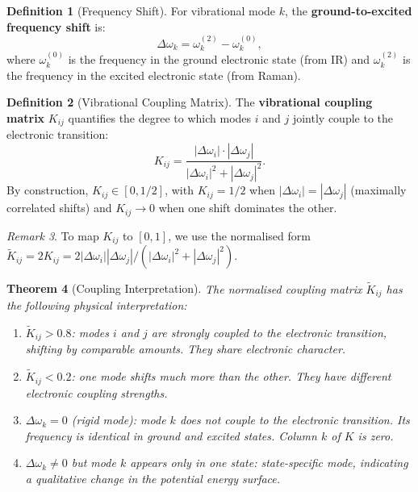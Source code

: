 \documentclass[11pt,a4paper]{article}
\newtheorem{theorem}{Theorem}[section]
\theoremstyle{definition}
\newtheorem{definition}[theorem]{Definition}
\theoremstyle{remark}
\newtheorem{remark}[theorem]{Remark}
\begin{document}
\begin{definition}[Frequency Shift]
\label{def:freq_shift}
For vibrational mode $k$, the \textbf{ground-to-excited frequency shift} is:
\begin{equation}
\Delta\omega_k = \omega_k^{(2)} - \omega_k^{(0)},
\end{equation}
where $\omega_k^{(0)}$ is the frequency in the ground electronic state (from IR) and $\omega_k^{(2)}$ is the frequency in the excited electronic state (from Raman).
\end{definition}

\begin{definition}[Vibrational Coupling Matrix]
\label{def:coupling_matrix}
The \textbf{vibrational coupling matrix} $K_{ij}$ quantifies the degree to which modes $i$ and $j$ jointly couple to the electronic transition:
\begin{equation}
\label{eq:coupling}
K_{ij} = \frac{|\Delta\omega_i| \cdot |\Delta\omega_j|}{|\Delta\omega_i|^2 + |\Delta\omega_j|^2}.
\end{equation}
By construction, $K_{ij} \in [0, 1/2]$, with $K_{ij} = 1/2$ when $|\Delta\omega_i| = |\Delta\omega_j|$ (maximally correlated shifts) and $K_{ij} \to 0$ when one shift dominates the other.
\end{definition}

\begin{remark}
To map $K_{ij}$ to $[0,1]$, we use the normalised form $\tilde{K}_{ij} = 2K_{ij} = 2|\Delta\omega_i||\Delta\omega_j|/(|\Delta\omega_i|^2 + |\Delta\omega_j|^2)$.
\end{remark}

\begin{theorem}[Coupling Interpretation]
\label{thm:coupling_interp}
The normalised coupling matrix $\tilde{K}_{ij}$ has the following physical interpretation:
\begin{enumerate}[label=(\alph*)]
  \item $\tilde{K}_{ij} > 0.8$: modes $i$ and $j$ are strongly coupled to the electronic transition, shifting by comparable amounts. They share electronic character.
  \item $\tilde{K}_{ij} < 0.2$: one mode shifts much more than the other. They have different electronic coupling strengths.
  \item $\Delta\omega_k = 0$ (rigid mode): mode $k$ does not couple to the electronic transition. Its frequency is identical in ground and excited states. Column $k$ of $K$ is zero.
  \item $\Delta\omega_k \neq 0$ but mode $k$ appears only in one state: state-specific mode, indicating a qualitative change in the potential energy surface.
\end{enumerate}
\end{theorem}
\end{document}
